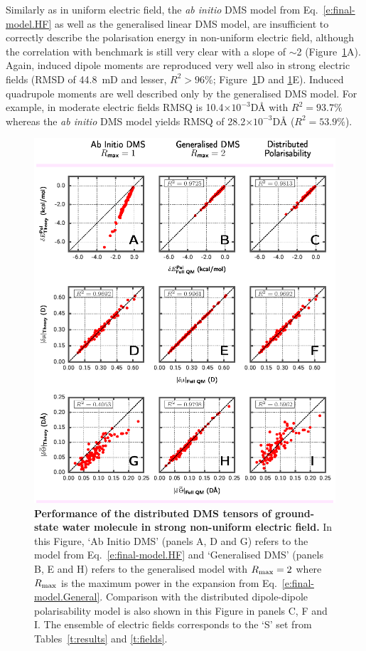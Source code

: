 \documentclass[aip,amsmath,amssymb,reprint,floatfix]{revtex4-1}
\begin{document}
Similarly as in uniform electric field, 
the \emph{ab initio} DMS model from Eq.~\eqref{e:final-model.HF} 
as well as the generalised linear DMS model, are insufficient to correctly describe the polarisation energy 
in non\hyp{}uniform electric field, although the correlation with benchmark is still very clear with a slope of $\sim$2
(Figure~\ref{f:fig-2}A). Again, induced dipole moments are reproduced very well also
in strong electric fields (RMSD of 44.8~mD and lesser, $R^2>96\%$; Figure~\ref{f:fig-2}D and \ref{f:fig-2}E).
Induced quadrupole moments are well described only by the generalised DMS model.
For example, in moderate electric fields RMSQ is 10.4$\times 10^{-3}$D\AA{ }with $R^2=93.7\%$
whereas the \emph{ab initio} DMS model yields RMSQ of 28.2$\times 10^{-3}$D\AA{ }($R^2=53.9\%$).

\begin{figure}[h]
\includegraphics[width=\textwidth]{fig-2.eps}
\caption{\label{f:fig-2} {\bf Performance of the distributed DMS tensors of ground\hyp{}state water molecule in strong
non\hyp{}uniform electric field.}
In this Figure, `Ab Initio DMS' (panels A, D and G) 
refers to the model from Eq.~\eqref{e:final-model.HF} and
`Generalised DMS' (panels B, E and H) 
refers to the generalised model with $R_{\rm max}=2$ 
where $R_{\rm max}$ is the maximum power
in the expansion from Eq.~\eqref{e:final-model.General}.
Comparison with the distributed dipole\hyp{}dipole polarisability model %
is also shown in this Figure in panels C, F and I. 
The ensemble of electric fields corresponds to the `S' set
from Tables~\ref{t:results} and \ref{t:fields}.}
\end{figure}
\end{document}
